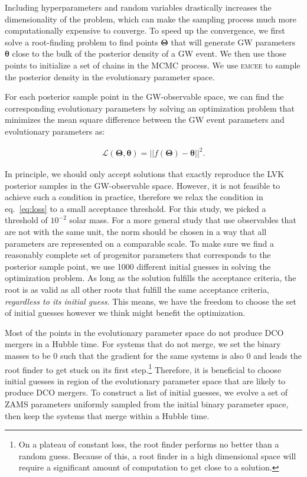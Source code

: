 \documentclass[linenumbers,twocolumn]{aastex631}
\begin{document}
Including hyperparameters and random variables %
drastically increases the dimensionality of the problem, which can make the
sampling process much more computationally expensive to converge. To speed up
the convergence, we first solve a root-finding problem to find points
$\bm{\Theta}$ that will generate GW parameters $\bm{\theta}$ close to the bulk
of the posterior density of a GW event.  We then use those points to initialize
a set of chains in the MCMC process. We use \textsc{emcee} \cite{emcee}
to sample the posterior density in the evolutionary parameter space.

For each posterior sample point in the GW-observable space, we can find the
corresponding evolutionary parameters by solving an optimization problem that
minimizes the mean square difference between the GW event parameters and
evolutionary parameters as:

\begin{align}
\mathcal{L}(\bm{\Theta},\bm{\theta}) = ||f(\bm{\Theta})-\bm{\theta}||^2.
\label{eq:loss}
\end{align}

In principle, we should only accept solutions that exactly reproduce the LVK
posterior samples in the GW-observable space. However, it is not feasible to
achieve such a condition in practice, therefore we relax the condition in
eq.~\ref{eq:loss} to a small acceptance threshold. For this study, we picked a
threshold of $10^{-2}$ solar mass. For a more general study that use
observables that are not with the same unit, the norm should be chosen in a way
that all parameters are represented on a comparable scale. To make sure we find
a reasonably complete set of progenitor parameters that corresponds to the
posterior sample point, we use 1000 different initial guesses in solving the
optimization problem. As long as the solution fulfills the acceptance criteria,
the root is as valid as all other roots that fulfill the same acceptance
criteria, \emph{regardless to its initial guess}. This means, we have the
freedom to choose the set of initial guesses however we think might benefit the
optimization.

Most of the points in the evolutionary parameter space do not produce DCO
mergers in a Hubble time. For systems that do not merge, we set the binary
masses to be $0$ such that the gradient for the same systems is also $0$ and
leads the root finder to get stuck on its first step.{\footnote{On a plateau of
constant loss, the root finder performs no better than a random guess. Because
of this, a root finder in a high dimensional space will require a significant
amount of computation to get close to a solution.}} Therefore, it is beneficial
to choose initial guesses in region of the evolutionary parameter space that are
likely to produce DCO mergers. To construct a list of initial guesses, we evolve
a set of ZAMS parameters uniformly sampled from the initial binary parameter
space, then keep the systems that merge within a Hubble time.
\end{document}
